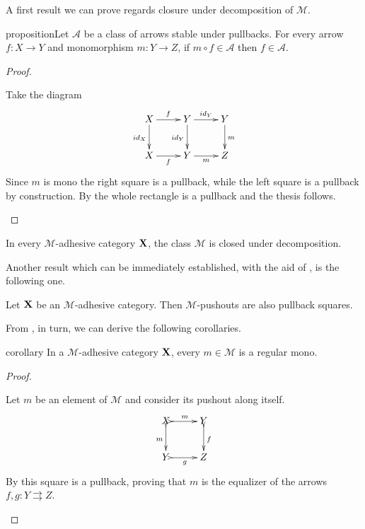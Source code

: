\documentclass[a4paper,UKenglish,cleveref,pdftex, thm-restate,numberwithinsect]{lipics}
\newcommand{\id}[1]{\mathsf{id}_{#1}}
\def\X{\textbf {\textup{X}}}
\def\Y{\textbf {\textup{Y}}}
\begin{document}
A first result we can prove regards closure under decomposition of $\mathcal{M}$.

\begin{theoremEnd}[category=sec2]{proposition}\label{prop:deco}Let  $\mathcal{A}$ be a class of arrows stable under pullbacks. For every arrow $f\colon X\to Y$ and monomorphism $m\colon Y\to Z$, if $m\circ f \in\mathcal{A}$ then $f\in \mathcal{A}$.
\end{theoremEnd}
\begin{proof}\begin{proofEnd}
	Take the diagram
	\[\xymatrix{X \ar[d]_{\id{X}}\ar[r]^{f}& Y \ar[r]^{\id{Y}}  \ar[d]_{\id{Y}}& Y \ar[d]^{m}\\
		X \ar[r]_{f}& Y \ar[r]_{m} & Z}\]
	Since $m$ is mono the right square is a pullback, while the left square is a pullback by construction. By  the whole rectangle is a pullback and the thesis follows.
	\end{proofEnd}
\end{proof}
\begin{corollary}\label{cor:deco}
	In every $\mathcal{M}$-adhesive category $\X$, the class $\mathcal{M}$ is closed under decomposition.
\end{corollary}

Another result which can be immediately established, with the aid of , is the following one.
\begin{proposition}\label{prop:pbpoad}
	Let $\X$ be an $\mathcal{M}$-adhesive category. Then $\mathcal{M}$-pushouts are also pullback squares.
\end{proposition}

From , in turn, we can derive the following corollaries.
\begin{theoremEnd}[category=sec2]{corollary}\label{cor:rego}
	In a $\mathcal{M}$-adhesive category $\X$, every $m\in\mathcal{M}$ is a regular mono.
\end{theoremEnd}
\begin{proof}\begin{proofEnd}
		Let $m$ be an element of $\mathcal{M}$ and consider its pushout along itself.
		\[\xymatrix{X\ar@{>->}[r]^m \ar@{>->}[d]_m& Y\ar@{>->}[d]^{f}\\Y \ar@{>->}[r]_g & Z}\]
		By  this square is a pullback, proving that $m$ is the equalizer of the arrows $f,g\colon Y\rightrightarrows Z$. 
	\end{proofEnd} 
\end{proof}
\end{document}
